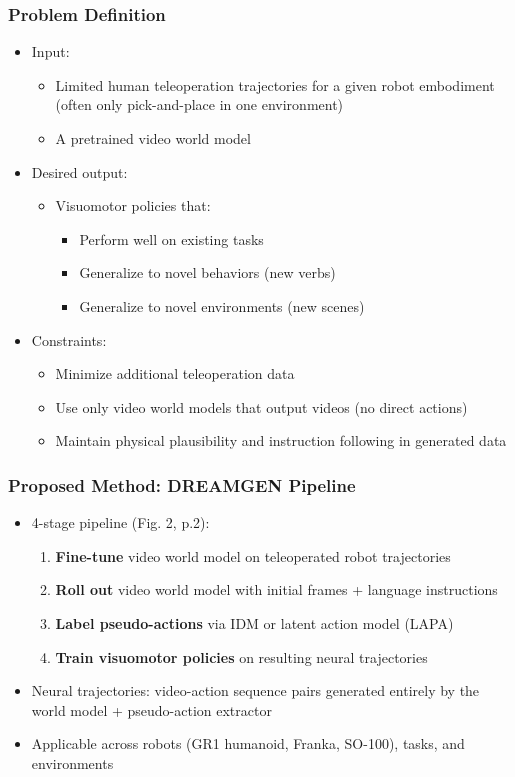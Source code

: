 \documentclass{beamer}
\begin{document}
\begin{frame}
  \frametitle{Problem Definition}
  \small
  \begin{itemize}
    \item Input:
      \begin{itemize}
        \item Limited human teleoperation trajectories for a given robot embodiment (often only pick-and-place in one environment)
        \item A pretrained video world model
      \end{itemize}
    \item Desired output:
      \begin{itemize}
        \item Visuomotor policies that:
          \begin{itemize}
            \item Perform well on existing tasks
            \item Generalize to novel behaviors (new verbs)
            \item Generalize to novel environments (new scenes)
          \end{itemize}
      \end{itemize}
    \item Constraints:
      \begin{itemize}
        \item Minimize additional teleoperation data
        \item Use only video world models that output videos (no direct actions)
        \item Maintain physical plausibility and instruction following in generated data
      \end{itemize}
  \end{itemize}
\end{frame}

\begin{frame}
  \frametitle{Proposed Method: DREAMGEN Pipeline}
  \small
  \begin{itemize}
    \item 4-stage pipeline (Fig. 2, p.2):
      \begin{enumerate}
        \item \textbf{Fine-tune} video world model on teleoperated robot trajectories
        \item \textbf{Roll out} video world model with initial frames + language instructions
        \item \textbf{Label pseudo-actions} via IDM or latent action model (LAPA)
        \item \textbf{Train visuomotor policies} on resulting neural trajectories
      \end{enumerate}
    \item Neural trajectories: video-action sequence pairs generated entirely by the world model + pseudo-action extractor
    \item Applicable across robots (GR1 humanoid, Franka, SO-100), tasks, and environments
  \end{itemize}
\end{frame}
\end{document}
